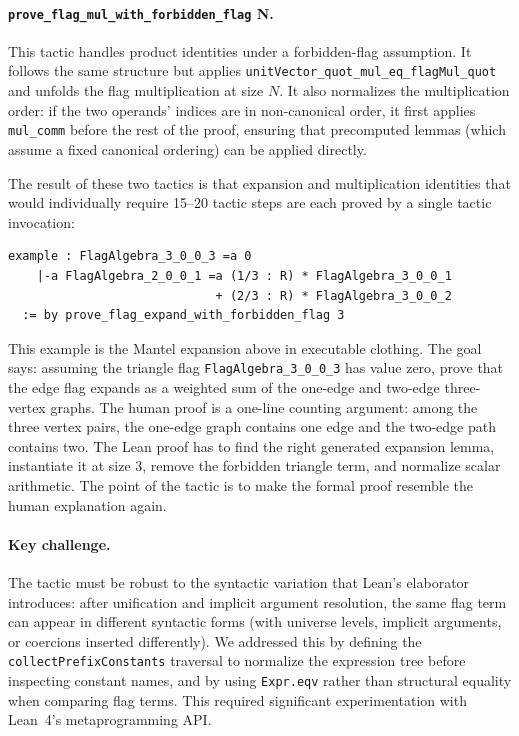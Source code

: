\documentclass{article}
\newcommand{\lean}[1]{\texttt{#1}}
\begin{document}
\paragraph{\lean{prove\_flag\_mul\_with\_forbidden\_flag} N.}
This tactic handles product identities under a forbidden-flag assumption.  It
follows the same structure but applies \lean{unitVector\_quot\_mul\_eq\_flagMul\_quot}
and unfolds the flag multiplication at size $N$.  It also normalizes the
multiplication order: if the two operands' indices are in non-canonical order,
it first applies \lean{mul\_comm} before the rest of the proof, ensuring that
precomputed lemmas (which assume a fixed canonical ordering) can be applied
directly.

The result of these two tactics is that expansion and multiplication identities
that would individually require 15--20 tactic steps are each proved by a single
tactic invocation:
\begin{lstlisting}
example : FlagAlgebra_3_0_0_3 =a 0
    |-a FlagAlgebra_2_0_0_1 =a (1/3 : R) * FlagAlgebra_3_0_0_1
                             + (2/3 : R) * FlagAlgebra_3_0_0_2
  := by prove_flag_expand_with_forbidden_flag 3
\end{lstlisting}

This example is the Mantel expansion above in executable clothing.  The goal
says: assuming the triangle flag \lean{FlagAlgebra\_3\_0\_0\_3} has value zero,
prove that the edge flag expands as a weighted sum of the one-edge and
two-edge three-vertex graphs.  The human proof is a one-line counting argument:
among the three vertex pairs, the one-edge graph contains one edge and the
two-edge path contains two.  The Lean proof has to find the right generated
expansion lemma, instantiate it at size $3$, remove the forbidden triangle
term, and normalize scalar arithmetic.  The point of the tactic is to make the
formal proof resemble the human explanation again.

\paragraph{Key challenge.}
The tactic must be robust to the syntactic variation that Lean's elaborator
introduces: after unification and implicit argument resolution, the same flag
term can appear in different syntactic forms (with universe levels, implicit
arguments, or coercions inserted differently).  We addressed this by defining
the \lean{collectPrefixConstants} traversal to normalize the expression tree
before inspecting constant names, and by using \lean{Expr.eqv} rather than
structural equality when comparing flag terms.  This required significant
experimentation with Lean~4's metaprogramming API.
\end{document}
